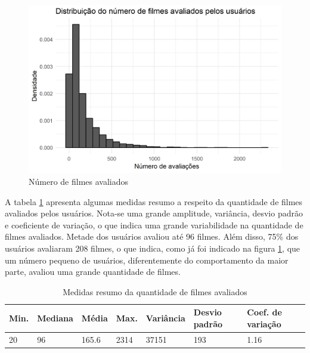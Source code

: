 \documentclass[12pt,a4paper,header]{abnt}
\begin{document}
\begin{figure}[h]
\centering
\includegraphics[]{../R/img/Distribuicao_ratings.png}
\caption{Número de filmes avaliados}
\label{hist_num_ratings}
\end{figure}

A tabela \ref{resumo_rating} apresenta algumas medidas resumo a respeito da quantidade de filmes avaliados pelos usuários. Nota-se uma grande amplitude, variância, desvio padrão e coeficiente de variação, o que indica uma grande variabilidade na quantidade de filmes avaliados. Metade dos usuários avaliou até 96 filmes. Além disso, 75\% dos usuários avaliaram 208 filmes, o que indica, como já foi indicado na figura \ref{hist_num_ratings}, que um número pequeno de usuários, diferentemente do comportamento da maior parte, avaliou uma grande quantidade de filmes.

\begin{table}[h]
\caption{Medidas resumo da quantidade de filmes avaliados}
\label{resumo_rating}
\centering
\begin{tabular}{l|l|l|l|l|l|l}
\hline
\textbf{Min.} & \textbf{Mediana} & \textbf{Média} & \textbf{Max.} & \textbf{Variância} & \textbf{Desvio padrão} & \textbf{Coef. de variação} \\
\hline
20     & 96      & 165.6 & 2314   & 37151     & 193   & 1.16          \\
\hline
\end{tabular}
\end{table}

\end{document}
